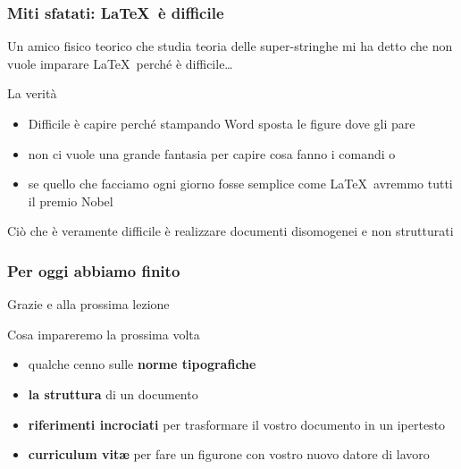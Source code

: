 \documentclass[svgnames,%
	ucs,%
	pdftex]{guitbeamer}
\begin{document}
\begin{frame}
  \frametitle{Miti sfatati: \LaTeX\ \`e difficile} 
	Un amico fisico teorico che studia teoria delle super-stringhe mi ha detto che non vuole imparare \LaTeX\ perch\'e \`e difficile\dots
  \medskip
	\begin{block}{La verit\`a}
		\begin{itemize}
			\item Difficile \`e capire perch\'e stampando Word sposta le figure dove gli pare
			\item non ci vuole una grande fantasia per capire cosa fanno i comandi  o 
			\item se quello che facciamo ogni giorno fosse semplice come \LaTeX\ avremmo tutti il premio Nobel
		\end{itemize}
	\end{block}
  \smallskip
	\begin{block}{}
		Ci\`o che \`e veramente difficile \`e realizzare documenti disomogenei e non strutturati
	\end{block}
\end{frame}

\begin{frame}
  \frametitle{Per oggi abbiamo finito}
	\begin{center}
	  \huge
		Grazie e alla prossima lezione
	\end{center}
  \medskip
	\begin{block}{Cosa impareremo la prossima volta}
		\begin{itemize}
			\item qualche cenno sulle \textbf{norme tipografiche} 
			\item \textbf{la struttura} di un documento
			\item \textbf{riferimenti incrociati} per trasformare il vostro documento in un ipertesto
			\item \textbf{curriculum vit\ae} per fare un figurone con vostro nuovo datore di lavoro
		\end{itemize}
	\end{block}
\end{frame}
\end{document}
